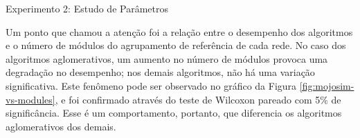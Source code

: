 \begin{section}{Experimento 2: Estudo de Parâmetros}





Um ponto que chamou a atenção foi a relação entre o desempenho dos algoritmos e o número de módulos do agrupamento de referência de cada rede. No caso dos algoritmos aglomerativos, um aumento no número de módulos provoca uma degradação no desempenho; nos demais algoritmos, não há uma variação significativa. Este fenômeno pode ser observado no gráfico da Figura \ref{fig:mojosim-vs-modules}, e foi confirmado através do teste de Wilcoxon pareado com 5\% de significância. Esse é um comportamento, portanto, que diferencia os algoritmos aglomerativos dos demais. 


\end{section}
